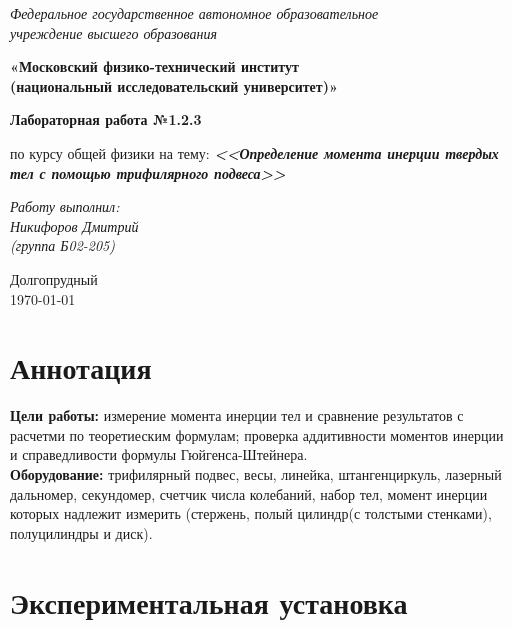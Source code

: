 \documentclass[a4paper,14pt]{extarticle}
\begin{document}
	\begin{center}
		\textit{Федеральное государственное автономное образовательное\\ учреждение высшего образования }
		
		\vspace{0.5ex}
		
		\textbf{«Московский физико-технический институт\\ (национальный исследовательский университет)»}
	\end{center}
	
	\vspace{10ex}
	
	
	\begin{center}
		\vspace{13ex}	
		\textbf{Лабораторная работа №1.2.3}	
		\vspace{1ex}
		
		по курсу общей физики		
		на тему:		
		\textbf{\textit{<<Определение момента инерции твердых тел с помощью трифилярного подвеса>>}}		
		\vspace{30ex}
		
		\begin{flushright}
			\noindent
			\textit{Работу выполнил:}\\  
			\textit{Никифоров Дмитрий \\(группа Б02-205)}
		\end{flushright}
		\vfill
		Долгопрудный \\ \today
		
	\end{center}
	\newpage
	\section{Аннотация}
	
	\textbf{Цели работы:} измерение момента инерции тел и сравнение результатов с расчетми по теоретиеским формулам; проверка аддитивности моментов инерции и справедливости формулы Гюйгенса-Штейнера.\\
	\textbf{Оборудование:} трифилярный подвес, весы, линейка, штангенциркуль, лазерный дальномер, секундомер, счетчик числа колебаний, набор тел, момент инерции которых надлежит измерить (стержень, полый цилиндр(с толстыми стенками), полуцилиндры и диск).
	
	\section {Экспериментальная установка}
	
\end{document}
